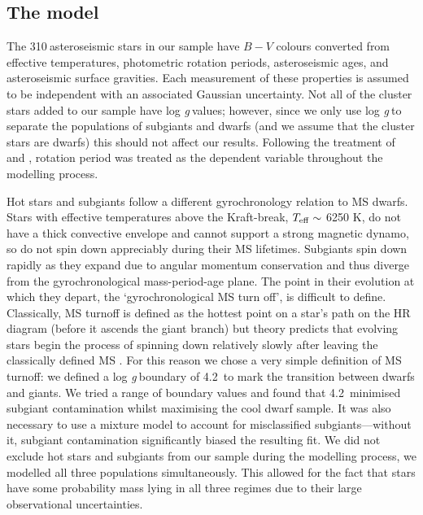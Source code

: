\documentclass[useAMS, usenatbib]{mn2e}
\newcommand{\logg}{log \emph{g}}
\newcommand{\nastero}{310}
\newcommand{\subcut}{4.2~}
\begin{document}
\subsection{The model}

The \nastero$~$asteroseismic stars in our sample have $B-V$ colours converted
from effective temperatures, photometric rotation periods,
asteroseismic ages, and asteroseismic surface gravities.
Each measurement of these properties is assumed to be independent with an
associated Gaussian uncertainty.
Not all of the cluster stars added to our sample have \logg$~$values; however,
since we only use \logg$~$to separate the populations of subgiants and dwarfs
(and we assume that the cluster stars are dwarfs) this should not affect our
results.
Following the treatment of \citet{Barnes2007} and \citet{Mamajek2008},
rotation period was treated as the dependent variable throughout the modelling
process.

Hot stars and subgiants follow a different gyrochronology relation to MS
dwarfs.
Stars with effective temperatures above the Kraft-break, $T_{\rm{eff}}
\sim$ 6250 K, \citep{Kraft1967} do not have a thick convective envelope and
cannot support a strong magnetic dynamo, so do not spin down appreciably
during their MS lifetimes.
Subgiants spin down rapidly as they expand due to angular momentum
conservation and thus diverge from the gyrochronological mass-period-age
plane.
The point in their evolution at which they depart, the `gyrochronological MS
turn off', is difficult to define.
Classically, MS turnoff is defined as the hottest point on a star's path on
the HR diagram (before it ascends the giant branch) but theory predicts that
evolving stars begin the process of spinning down relatively slowly after
leaving the classically defined MS \citep{vanSaders2013}.
For this reason we chose a very simple definition of MS turnoff: we defined
a \logg$~$boundary of \subcut to mark the transition between dwarfs and
giants.
We tried a range of boundary values and found that \subcut minimised subgiant
contamination whilst maximising the cool dwarf sample.  %
It was also necessary to use a mixture model to account for misclassified
subgiants---without it, subgiant contamination significantly biased the
resulting fit.
We did not exclude hot stars and subgiants from our sample during the
modelling process, we modelled all three populations simultaneously.
This allowed for the fact that stars have some probability mass lying in all
three regimes due to their large observational uncertainties.
\end{document}
